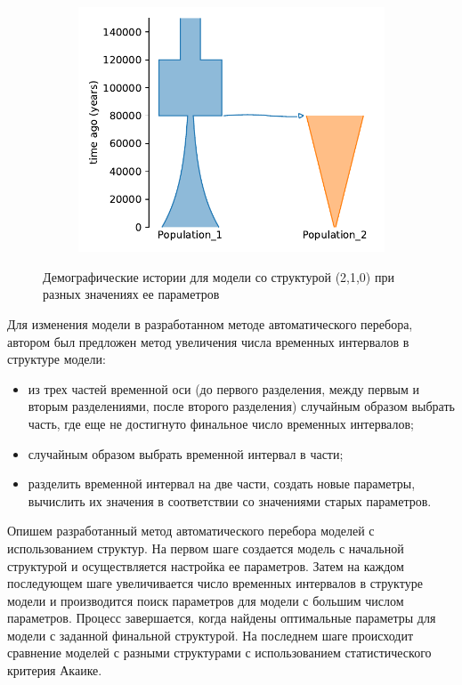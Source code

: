 \documentclass[a4paper,14pt,oneside,openany,article]{memoir}
\begin{document}
\begin{figure}[h]
\begin{subfigure}[c]{.32\textwidth}
    \includegraphics[width=\textwidth]{images_2/picture_2pops_str_4.pdf}
    \caption{}
    \label{fig:auto:struct_2_1_0_ex_3}
    \end{subfigure}
    \caption{Демографические истории для модели со структурой (2,1,0) при разных значениях ее параметров}
    \label{fig:auto:struct_2_1_0_ex}
\end{figure}

Для изменения модели в разработанном методе автоматического перебора, автором был предложен метод увеличения числа временных интервалов в структуре модели:
\begin{itemize}
    \item из трех частей временной оси (до первого разделения, между первым и вторым разделениями, после второго разделения) случайным образом выбрать часть, где еще не достигнуто финальное число временных интервалов;
    \item случайным образом выбрать временной интервал в части;
    \item разделить временной интервал на две части, создать новые параметры, вычислить их значения в соответствии со значениями старых параметров.\\
\end{itemize}

Опишем разработанный метод автоматического перебора моделей с использованием структур.
На первом шаге создается модель с начальной структурой и осуществляется настройка ее параметров.
Затем на каждом последующем шаге увеличивается число временных интервалов в структуре модели и производится поиск параметров для модели с большим числом параметров.
Процесс завершается, когда найдены оптимальные параметры для модели с заданной финальной структурой.
На последнем шаге происходит сравнение моделей с разными структурами с использованием статистического критерия Акаике.\\
\end{document}
